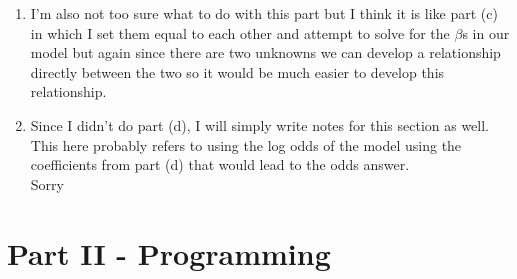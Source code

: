 \documentclass{article}
\begin{document}
\begin{enumerate}
\begin{enumerate}
        \item
        
        I'm also not too sure what to do with this part but I think it is like part (c) in which I set them equal to each other and attempt to solve for the $\beta$s in our model but again since there are two unknowns we can develop a relationship directly between the two so it would be much easier to develop this relationship.
        
        \item
        
        Since I didn't do part (d), I will simply write notes for this section as well. This here probably refers to using the log odds of the model using the coefficients from part (d) that would lead to the odds answer.\\
        Sorry
        
    \end{enumerate}
    
\end{enumerate}

\section{Part II - Programming}
\end{document}
